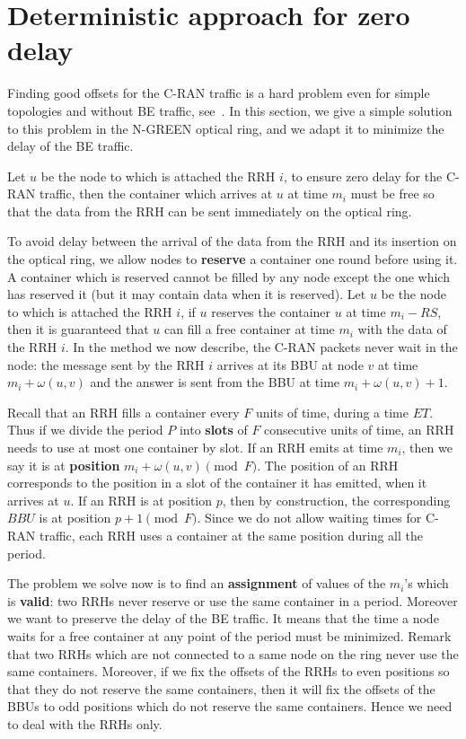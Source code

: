 \documentclass[10pt, conference, letterpaper]{IEEEtran}
\begin{document}
\section{Deterministic approach for zero delay} \label{sec:deterministicalgorithms}

Finding good offsets for the C-RAN traffic is a hard problem even for simple topologies and without BE traffic, see~\cite{dominique2018deterministic}. In this section, we give a simple solution to this problem in the N-GREEN optical ring, and we adapt it to minimize the delay of the BE traffic.

Let $u$ be the node to which is attached the RRH $i$, to ensure zero delay for the C-RAN traffic, then the container which arrives at $u$ at time $m_i$ must be free so that the data from the RRH can be sent immediately on the optical ring.

To avoid delay between the arrival of the data from the RRH and its insertion on the optical ring,
we allow nodes to \textbf{reserve} a container one round before using it. A container which is reserved cannot be filled by any node except the one which has reserved it (but it may contain data when it is reserved).
Let $u$ be the node to which is attached the RRH $i$, if $u$ reserves the container $u$ at time $m_i - RS$, then it is guaranteed that $u$ can fill a free container at time $m_i$ with the data of the RRH $i$.
In the method we now describe, the C-RAN packets never wait in the node: the message sent by the RRH $i$ arrives at its BBU at node $v$ at time $m_i + \omega(u,v)$ and the answer is sent from the BBU at time $m_i + \omega(u,v) +1$.

Recall that an RRH fills a container every $F$ units of time, during a time $ET$.
Thus if we divide the period $P$ into \textbf{slots} of $F$ consecutive units of time, an RRH needs to use at most one container by slot. If an RRH emits at time $m_i$, then we say it is at \textbf{position} $m_i + \omega(u,v)\pmod F$.
The position of an RRH corresponds to the position in a slot of the container it has emitted, when it arrives at $u$.
If an RRH is at position $p$, then by construction, the corresponding $BBU$ is at position $p+1\pmod F$. Since we do not allow waiting times for C-RAN traffic, each RRH uses a container at the same position during all the period.

The problem we solve now is to find an \textbf{assignment} of values of the $m_i$'s which is \textbf{valid}: two RRHs never reserve or use the same container in a period. Moreover we want to preserve the delay of the BE traffic. It means that the time a node waits for a free container at any point of the period must be minimized.
Remark that two RRHs which are not connected to a same node on the ring never use the same containers. Moreover, if we fix the offsets of the RRHs to even positions so that they do not reserve the same containers, then it will fix the offsets of the BBUs to odd positions which do not reserve the same containers. Hence we need to deal with the RRHs only.
\end{document}

